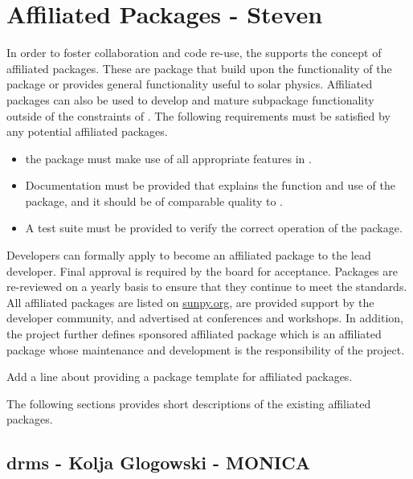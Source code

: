 \section{Affiliated Packages - Steven}
\label{sec:affil_package}

In order to foster collaboration and code re-use, the \sunpyproj supports the concept of affiliated packages. 
These are \python package that build upon the functionality of the \sunpypkg package or provides general functionality useful to solar physics. 
Affiliated packages can also be used to develop and mature subpackage functionality outside of the constraints of \sunpypkg. 
The following requirements must be satisfied by any potential affiliated packages.
\begin{itemize}
    \item the package must make use of all appropriate features in \sunpypkg.
    \item Documentation must be provided that explains the function and use of the package, and it should be of comparable quality to \sunpypkg.
    \item A test suite must be provided to verify the correct operation of the package.
\end{itemize}
Developers can formally apply to become an affiliated package to the lead developer. 
Final approval is required by the \sunpy board for acceptance. 
Packages are re-reviewed on a yearly basis to ensure that they continue to meet the standards. 
All affiliated packages are listed on \url{sunpy.org}, are provided support by the \sunpy developer community, and advertised at conferences and workshops. 
In addition, the project further defines sponsored affiliated package which is an affiliated package whose maintenance and development is the responsibility of the \sunpy project.  

Add a line about providing a package template for affiliated packages.

The following sections provides short descriptions of the existing affiliated packages.
\label{sec:affil_packages}

\subsection{drms - Kolja Glogowski - MONICA}
\label{sec:drms}

